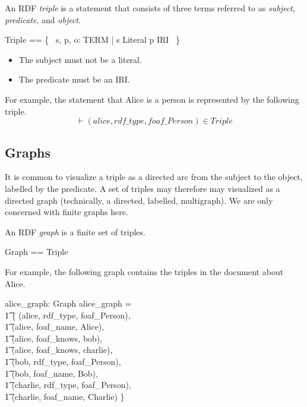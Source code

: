 \documentclass{article}
\begin{document}
An RDF {\em triple} is a statement that consists of three terms referred to as {\em subject}, {\em predicate}, and {\em object}.
\begin{zed}
Triple == \{~ s, p, o: TERM | s \notin Literal \land p \in IRI ~\}
\end{zed}
\begin{itemize}
\item The subject must not be a literal.
\item The predicate must be an IRI.
\end{itemize}

For example, the statement that Alice is a person is represented by the following triple.
\[\vdash 
	(alice, rdf\_type, foaf\_Person) \in Triple
\]

\subsection{Graphs}

It is common to visualize a triple as a directed arc from the subject to the object, labelled by the predicate.
A set of triples may therefore may visualized as a directed graph (technically, a directed, labelled, multigraph).
We are only concerned with finite graphs here.

An RDF {\em graph} is a finite set of triples.
\begin{zed}
Graph == \finset Triple
\end{zed}

For example, the following graph contains the triples in the document about Alice.
\begin{axdef}
	alice\_graph: Graph
\where
	alice\_graph = \\
\t1		\{ (alice, rdf\_type, foaf\_Person), \\
\t1		(alice, foaf\_name, Alice), \\
\t1		(alice, foaf\_knows, bob), \\
\t1		(alice, foaf\_knows, charlie), \\
\t1		(bob, rdf\_type, foaf\_Person), \\
\t1		(bob, foaf\_name, Bob), \\
\t1		(charlie, rdf\_type, foaf\_Person), \\
\t1		(charlie, foaf\_name, Charlie) \}
\end{axdef}
\end{document}
